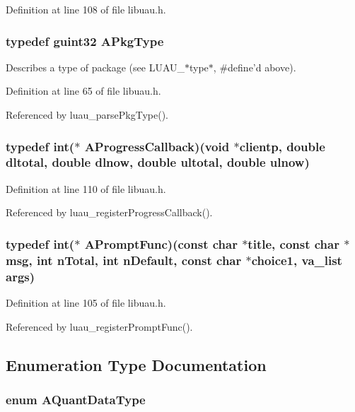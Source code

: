 Definition at line 108 of file libuau.h.
\subsubsection{\setlength{\rightskip}{0pt plus 5cm}typedef guint32 {\bf APkg\-Type}}\label{libuau_8h_a17}


Describes a type of package (see LUAU\_\-$\ast$type$\ast$, \#define'd above). 



Definition at line 65 of file libuau.h.

Referenced by luau\_\-parse\-Pkg\-Type().
\subsubsection{\setlength{\rightskip}{0pt plus 5cm}typedef int($\ast$ {\bf AProgress\-Callback})(void $\ast$clientp, double dltotal, double dlnow, double ultotal, double ulnow)}\label{libuau_8h_a22}




Definition at line 110 of file libuau.h.

Referenced by luau\_\-register\-Progress\-Callback().
\subsubsection{\setlength{\rightskip}{0pt plus 5cm}typedef int($\ast$ {\bf APrompt\-Func})(const char $\ast$title, const char $\ast$msg, int n\-Total, int n\-Default, const char $\ast$choice1, va\_\-list args)}\label{libuau_8h_a18}




Definition at line 105 of file libuau.h.

Referenced by luau\_\-register\-Prompt\-Func().

\subsection{Enumeration Type Documentation}
\subsubsection{\setlength{\rightskip}{0pt plus 5cm}enum {\bf AQuant\-Data\-Type}}\label{libuau_8h_a101}



